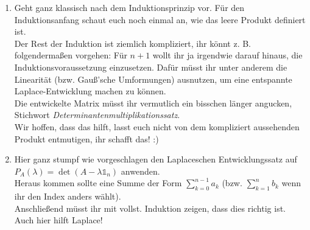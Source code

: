 {\begin{enumerate}
    \item Geht ganz klassisch nach dem Induktionsprinzip vor. Für den Induktionsanfang schaut euch noch einmal an, wie das leere Produkt definiert ist.\\
    Der Rest der Induktion ist ziemlich kompliziert, ihr könnt z. B. folgendermaßen vorgehen: Für $n+1$ wollt ihr ja irgendwie darauf hinaus, die Induktionsvoraussetzung einzusetzen. Dafür müsst ihr unter anderem die Linearität (bzw. Gauß'sche Umformungen) ausnutzen, um eine entspannte Laplace-Entwicklung machen zu können.\\
    Die entwickelte Matrix müsst ihr vermutlich ein bisschen länger angucken, Stichwort \textit{Determinantenmultiplikationssatz}.\\
    Wir hoffen, dass das hilft, lasst euch nicht von dem kompliziert aussehenden Produkt entmutigen, ihr schafft das! :)
    \item Hier ganz stumpf wie vorgeschlagen den Laplaceschen Entwicklungssatz auf $P_A(\lambda)=\det(A-\lambda\mathds{1}_n)$ anwenden.\\
    Heraus kommen sollte eine Summe der Form $\sum_{k=0}^{n-1}a_k$ (bzw. $\sum_{k=1}^nb_k$ wenn ihr den Index anders wählt).\\
    Anschließend müsst ihr mit vollst. Induktion zeigen, dass dies richtig ist. Auch hier hilft Laplace!
\end{enumerate}
}